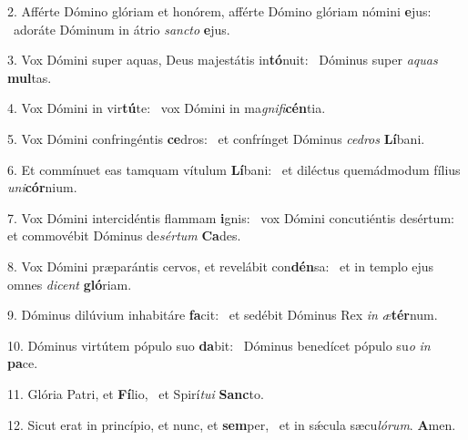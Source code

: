 2. Afférte Dómino glóriam et honórem, afférte Dómino glóriam nómini \textbf{e}jus: \ast\  adoráte Dóminum in átrio \textit{sanc}\textit{to} \textbf{e}jus.\

3. Vox Dómini super aquas, Deus majestátis in\textbf{tó}nuit: \ast\  Dóminus super \textit{a}\textit{quas} \textbf{mul}tas.\

4. Vox Dómini in vir\textbf{tú}te: \ast\  vox Dómini in ma\textit{gni}\textit{fi}\textbf{cén}tia.\

5. Vox Dómini confringéntis \textbf{ce}dros: \ast\  et confrínget Dóminus \textit{ce}\textit{dros} \textbf{Lí}bani.\

6. Et commínuet eas tamquam vítulum \textbf{Lí}bani: \ast\  et diléctus quemádmodum fílius \textit{u}\textit{ni}\textbf{cór}nium.\

7. Vox Dómini intercidéntis flammam \textbf{i}gnis: \ast\  vox Dómini concutiéntis desértum: et commovébit Dóminus de\textit{sér}\textit{tum} \textbf{Ca}des.\

8. Vox Dómini præparántis cervos, et revelábit con\textbf{dén}sa: \ast\  et in templo ejus omnes \textit{di}\textit{cent} \textbf{gló}riam.\

9. Dóminus dilúvium inhabitáre \textbf{fa}cit: \ast\  et sedébit Dóminus Rex \textit{in} \textit{æ}\textbf{tér}num.\

10. Dóminus virtútem pópulo suo \textbf{da}bit: \ast\  Dóminus benedícet pópulo su\textit{o} \textit{in} \textbf{pa}ce.\

11. Glória Patri, et \textbf{Fí}lio, \ast\  et Spirí\textit{tu}\textit{i} \textbf{Sanc}to.\

12. Sicut erat in princípio, et nunc, et \textbf{sem}per, \ast\  et in sǽcula sæcu\textit{ló}\textit{rum}. \textbf{A}men.\

